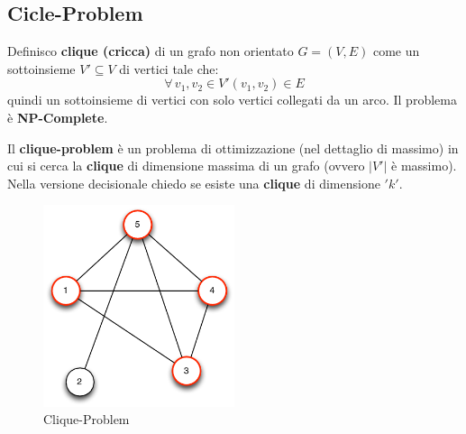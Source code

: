 							\subsection{Cicle-Problem}
							\begin{definizione}
								Definisco \textbf{clique (\textup{cricca})} di un grafo non orientato
								$G=(V,E)$ come un sottoinsieme $V'\subseteq V$ di vertici tale che:
								\[\forall \,v_1,v_2\in V' (v_1,v_2)\in E\]
								quindi un sottoinsieme di vertici con solo vertici collegati da un arco. Il problema è \textbf{NP-Complete}.
								\begin{nota}
									Il \textbf{clique-problem} è un problema di ottimizzazione (nel
									dettaglio di massimo) in cui si cerca la \textbf{clique} di dimensione massima
									di un grafo (ovvero $|V'|$ è massimo). Nella versione decisionale chiedo se
									esiste una \textbf{clique} di dimensione $ 'k' $.\\
								\end{nota}
								\begin{figure}[h!]
									\centering
									\includegraphics[width=0.5\textwidth]{img/The-maximum-clique-problem-MCP.png}
									\caption{Clique-Problem}
									\label{fig:Clique}
								\end{figure}
							\end{definizione}
